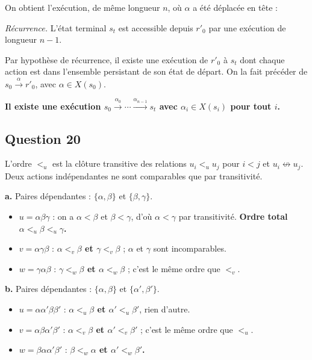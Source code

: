 \documentclass[11pt,a4paper]{article}
\providecommand{\tightlist}{\setlength{\itemsep}{0pt}\setlength{\parskip}{0pt}}
\newcommand{\equationajustee}[1]{%
  \sbox{\boiteequation}{$\displaystyle #1$}%
  \ifdim\wd\boiteequation>\linewidth
    \[\resizebox{\linewidth}{!}{\usebox{\boiteequation}}\]%
  \else
    \[#1\]%
  \fi}
\begin{document}
On obtient l'exécution, de même longueur \(n\), où \(\alpha\) a été déplacée en tête :

\equationajustee{s_0\xrightarrow{\alpha}r'_0\xrightarrow{\beta_0}r'_1\cdots\xrightarrow{\beta_{k-1}}r'_k=r_{k+1}\xrightarrow{\beta_{k+1}}\cdots\xrightarrow{\beta_{n-1}}s_t.}

\emph{Récurrence.} L'état terminal \(s_t\) est accessible depuis \(r'_0\) par une exécution de longueur \(n-1\).

Par hypothèse de récurrence, il existe une exécution de \(r'_0\) à \(s_t\) dont chaque action est dans l'ensemble persistant de son état de départ. On la fait précéder de \(s_0\xrightarrow{\alpha}r'_0\), avec \(\alpha\in X(s_0)\).

\textbf{Il existe une exécution \(s_0\xrightarrow{\alpha_0}\cdots\xrightarrow{\alpha_{n-1}}s_t\) avec \(\alpha_i\in X(s_i)\) pour tout \(i\).}

\hypertarget{question-20}{%
\subsection{Question 20}\label{question-20}}

L'ordre \(<_u\) est la clôture transitive des relations \(u_i<_uu_j\) pour \(i<j\) et \(u_i\not\leftrightarrow u_j\). Deux actions indépendantes ne sont comparables que par transitivité.

\textbf{a.} Paires dépendantes : \(\{\alpha,\beta\}\) et \(\{\beta,\gamma\}\).

\begin{itemize}
\tightlist
\item
  \(u=\alpha\beta\gamma\) : on a \(\alpha<\beta\) et \(\beta<\gamma\), d'où \(\alpha<\gamma\) par transitivité. \textbf{Ordre total \(\alpha<_u\beta<_u\gamma\).}
\item
  \(v=\alpha\gamma\beta\) : \textbf{\(\alpha<_v\beta\) et \(\gamma<_v\beta\)} ; \(\alpha\) et \(\gamma\) sont incomparables.
\item
  \(w=\gamma\alpha\beta\) : \textbf{\(\gamma<_w\beta\) et \(\alpha<_w\beta\)} ; c'est le même ordre que \(<_v\).
\end{itemize}

\textbf{b.} Paires dépendantes : \(\{\alpha,\beta\}\) et \(\{\alpha',\beta'\}\).

\begin{itemize}
\tightlist
\item
  \(u=\alpha\alpha'\beta\beta'\) : \textbf{\(\alpha<_u\beta\) et \(\alpha'<_u\beta'\)}, rien d'autre.
\item
  \(v=\alpha\beta\alpha'\beta'\) : \textbf{\(\alpha<_v\beta\) et \(\alpha'<_v\beta'\)} ; c'est le même ordre que \(<_u\).
\item
  \(w=\beta\alpha\alpha'\beta'\) : \textbf{\(\beta<_w\alpha\) et \(\alpha'<_w\beta'\).}
\end{itemize}
\end{document}
